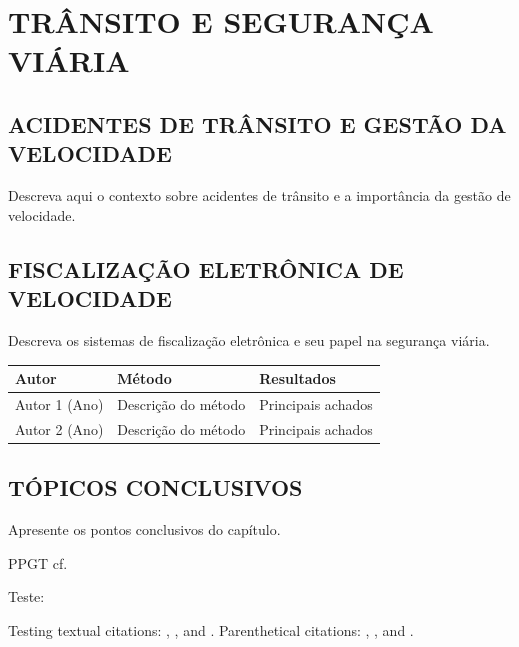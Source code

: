 \chapter{TRÂNSITO E SEGURANÇA VIÁRIA}
\label{capitulo2}

\section{ACIDENTES DE TRÂNSITO E GESTÃO DA VELOCIDADE}

Descreva aqui o contexto sobre acidentes de trânsito e a importância da gestão de velocidade.

\section{FISCALIZAÇÃO ELETRÔNICA DE VELOCIDADE}

Descreva os sistemas de fiscalização eletrônica e seu papel na segurança viária.

\begin{quadro}[htbp]
  \caption{Principais estudos sobre efeitos da fiscalização de velocidade na segurança viária, no âmbito internacional}
  \label{quad:estudos_internacionais}
  \centering
  \small
  \begin{tabular}{|p{4cm}|p{5cm}|p{4cm}|}
    \hline
    \textbf{Autor} & \textbf{Método} & \textbf{Resultados} \\
    \hline
    Autor 1 (Ano) & Descrição do método & Principais achados \\
    \hline
    Autor 2 (Ano) & Descrição do método & Principais achados \\
    \hline
  \end{tabular}
\end{quadro}

\section{TÓPICOS CONCLUSIVOS}

Apresente os pontos conclusivos do capítulo.


PPGT cf. \cite{soares2007ginga}

Teste:

Testing textual citations: \citet{davis2004}, \citet{brackstone1999}, and \citet{abdulsalam2015effect}. Parenthetical citations: \citep{davis2004}, \citep{brackstone1999}, and \citep{abdulsalam2015effect}.

